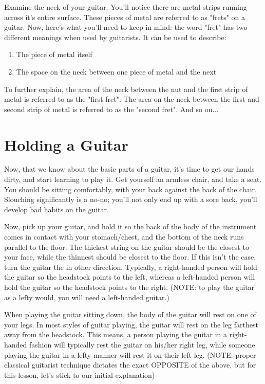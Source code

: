 Examine the neck of your guitar. You'll notice there are metal strips running
across it's entire surface. These pieces of metal are referred to as "frets" on
a guitar. Now, here's what you'll need to keep in mind: the word "fret" has two
different meanings when used by guitarists. It can be used to describe:
%
\begin{enumerate}
\item The piece of metal itself
\item The space on the neck between one piece of metal and the next 
\end{enumerate}
%
To further explain, the area of the neck between the nut and the first strip of
metal is referred to as the "first fret". The area on the neck between the
first and second strip of metal is referred to as the "second fret". And so
on... 

\section{Holding a Guitar}
Now, that we know about the basic parts of a guitar, it's time to get our hands
dirty, and start learning to play it. Get yourself an armless chair, and take a
seat. You should be sitting comfortably, with your back against the back of the
chair. Slouching significantly is a no-no; you'll not only end up with a sore
back, you'll develop bad habits on the guitar.

Now, pick up your guitar, and hold it so the back of the body of the instrument
comes in contact with your stomach/chest, and the bottom of the neck runs
parallel to the floor. The thickest string on the guitar should be the closest
to your face, while the thinnest should be closest to the floor. If this isn't
the case, turn the guitar the in other direction. Typically, a right-handed
person will hold the guitar so the headstock points to the left, whereas a
left-handed person will hold the guitar so the headstock points to the right.
(NOTE: to play the guitar as a lefty would, you will need a left-handed
guitar.)

When playing the guitar sitting down, the body of the guitar will rest on one
of your legs. In most styles of guitar playing, the guitar will rest on the leg
farthest away from the headstock. This means, a person playing the guitar in a
right-handed fashion will typically rest the guitar on his/her right leg, while
someone playing the guitar in a lefty manner will rest it on their left leg.
(NOTE: proper classical guitarist technique dictates the exact OPPOSITE of the
above, but for this lesson, let's stick to our initial explanation)

